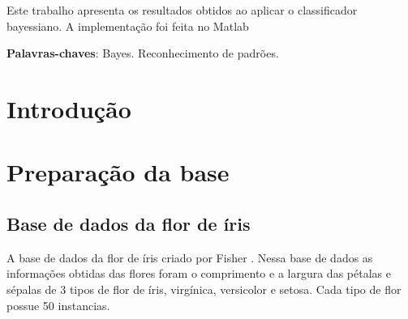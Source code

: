 \documentclass[ 
	article,			%
	11pt,				%
	oneside,			%
	a4paper,			%
	english,			%
	brazil,				%
	]{abntex2}
\begin{document}
\frenchspacing 


%
%
\maketitle

\begin{resumoumacoluna}
 Este trabalho apresenta os resultados obtidos ao aplicar o classificador
 bayessiano. A implementação foi feita no
 Matlab\texttrademark 
 
 
 \vspace{\onelineskip}
 
 \noindent
 \textbf{Palavras-chaves}: Bayes. Reconhecimento de padrões.
\end{resumoumacoluna}


\textual

\section*{Introdução}


\section{Preparação da base}
\subsection{Base de dados da flor de íris}
A base de dados da flor de íris criado por Fisher \cite{AHG2137}. Nessa base de
dados as informações obtidas das flores foram o comprimento e a largura das
pétalas e sépalas de 3 tipos de flor de íris, virgínica, versicolor e setosa.
Cada tipo de flor possue 50 instancias.
\end{document}

